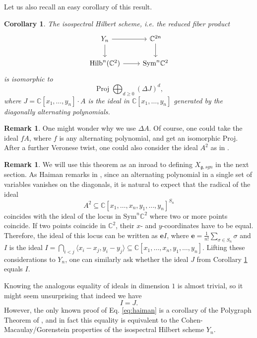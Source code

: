 \documentclass{amsart}
\numberwithin{equation}{section}
\newtheorem{corollary}[lemma]{Corollary}%
\theoremstyle{definition}
\newtheorem{remark}[lemma]{Remark}%
\def\Sym{{\mathrm{Sym}}}
\DeclareMathOperator{\Hilb}{Hilb}
\DeclareMathOperator{\Proj}{\mathrm{Proj}}
\newcommand{\fg}{\mathfrak{g}}
\newcommand{\C}{{\mathbb C}}
\newcommand{\e}{\mathbf{e}}
\begin{document}
Let us also recall an easy corollary of this result.
\begin{corollary}
\label{cor:isospec}
    The isospectral Hilbert scheme, i.e. the reduced fiber product 
    $$\begin{tikzcd}
        Y_n \arrow[d]\arrow[r] & \C^{2n}\arrow[d]\\
        \Hilb^n(\C^2)\arrow[r] & \Sym^n\C^2
    \end{tikzcd}$$
    is isomorphic to $$\Proj \bigoplus_{d\geq 0} (\Delta J)^d,$$ where $J=\C[x_1,\ldots, y_n]\cdot A$ is the ideal in $\C[x_1,\ldots, y_n]$ generated by the diagonally alternating polynomials.
\end{corollary}
\begin{remark}
One might wonder why we use $\Delta A$. Of course, one could take the ideal $fA$, where $f$ is any alternating polynomial, and get an isomorphic Proj. After a further Veronese twist, one could also consider the ideal $A^2$ as in \cite{Hai1}.
\end{remark}
\begin{remark}
\label{remark:haiman}
We will use this theorem as an inroad to defining $X_{\fg,sgn}$ in the next section. As Haiman remarks in \cite{Hai1}, since an alternating polynomial in a single set of variables vanishes on the diagonals, it is natural to expect that the radical of the ideal $$A^2\subseteq \C[x_1,\ldots,x_n,y_1,\ldots,y_n]^{S_n}$$ coincides with the ideal of the locus in $\Sym^n \C^2$ where two or more points coincide. If two points coincide in $\C^{2}$, their $x$- and $y$-coordinates have to be equal. Therefore, the ideal of this locus can be written as $\e I$, where $\e=\frac{1}{n!}\sum_{\sigma\in S_n}\sigma$ and $I$ is the ideal $I=\bigcap_{i<j}\langle x_i-x_j,y_i-y_j\rangle\subseteq\C[x_1,\ldots,x_n,y_1,\ldots,y_n]$.
Lifting these considerations to $Y_n$, one can similarly ask whether the ideal $J$ from Corollary \ref{cor:isospec} equals $I$.

Knowing the analogous equality of ideals in dimension $1$ is almost trivial, so it might seem unsurprising that indeed we have \begin{equation}
\label{eq:haiman}
I=J.\end{equation} However, the only known proof of Eq. \eqref{eq:haiman} is a corollary of the Polygraph Theorem of \cite{Haimanpolygraph}, and in fact this equality is equivalent to the Cohen-Macaulay/Gorenstein properties of the isospectral Hilbert scheme $Y_n$. 
\end{remark}
\end{document}
